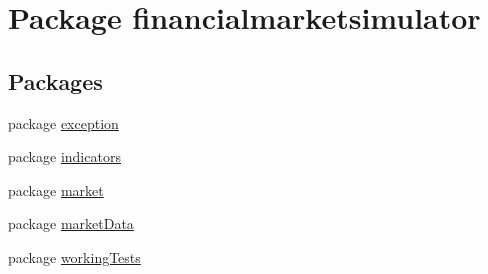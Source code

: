 \hypertarget{namespacefinancialmarketsimulator}{\section{Package financialmarketsimulator}
\label{namespacefinancialmarketsimulator}
}
\subsection*{Packages}
\begin{DoxyCompactItemize}
\item 
package \hyperlink{namespacefinancialmarketsimulator_1_1exception}{exception}
\item 
package \hyperlink{namespacefinancialmarketsimulator_1_1indicators}{indicators}
\item 
package \hyperlink{namespacefinancialmarketsimulator_1_1market}{market}
\item 
package \hyperlink{namespacefinancialmarketsimulator_1_1market_data}{market\+Data}
\item 
package \hyperlink{namespacefinancialmarketsimulator_1_1working_tests}{working\+Tests}
\end{DoxyCompactItemize}
